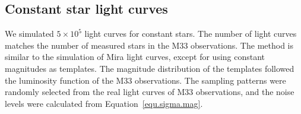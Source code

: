 \subsection{Constant star light curves}
We simulated  $5\times 10^5$ light curves for constant stars. The number of light curves matches the number of measured stars in the M33 observations. The method is similar to the simulation of Mira light curves, except for using constant magnitudes as templates. The magnitude distribution of the templates followed the luminosity function of the M33 observations. The sampling patterns were randomly selected from the real light curves of M33 observations, and the noise levels were calculated from Equation~\ref{equ.sigma.mag}.